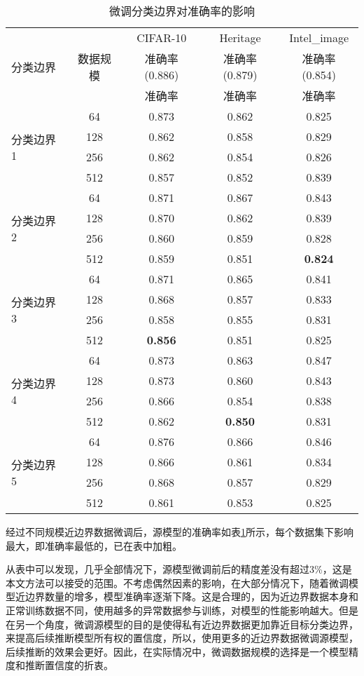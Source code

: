 \begin{table}[h]
	\centering
	\renewcommand\arraystretch{1.2}
	\caption{微调分类边界对准确率的影响}
	\label{table:3}
	\small
	\begin{tabular*}{14cm}{@{\extracolsep{\fill}} l c c c c}
		\toprule[1pt]
		\multirow{3}{5em}{分类边界}&\multirow{3}{5em}{数据规模} & CIFAR-10&Heritage&Intel\_image \\ 
		& & 准确率(0.886)&准确率(0.879)&准确率(0.854) \\
		\cline{3-5}	
		& &准确率&准确率&准确率 \\
		\hline
		\multirow{4}{5em}{分类边界1}&64&0.873&0.862&0.825 \\
		&128&0.862&0.858&0.829 \\
		&256&0.862&0.854&0.826 \\
		&512&0.857&0.852&0.839 \\
		\hline
		\multirow{4}{5em}{分类边界2}&64&0.871&0.867&0.843 \\
		&128&0.870&0.862&0.839 \\
		&256&0.860&0.859&0.828 \\
		&512&0.859&0.851&\textbf{0.824} \\
		\hline
		\multirow{4}{5em}{分类边界3}&64&0.871&0.865&0.841 \\
		&128&0.868&0.857&0.833 \\
		&256&0.858&0.855&0.831 \\
		&512&\textbf{0.856}&0.851&0.825 \\
		\hline
		\multirow{4}{5em}{分类边界4}&64&0.873&0.863&0.847 \\
		&128&0.873&0.860&0.843 \\
		&256&0.866&0.854&0.838 \\
		&512&0.862&\textbf{0.850}&0.831 \\
		\hline
		\multirow{4}{5em}{分类边界5}&64&0.876&0.866&0.846 \\
		&128&0.866&0.861&0.834 \\
		&256&0.868&0.857&0.829 \\
		&512&0.861&0.853&0.825 \\
		\bottomrule[1pt]
\end{tabular*}
\end{table}

	
经过不同规模近边界数据微调后，源模型的准确率如表\ref{table:3}所示，每个数据集下影响最大，即准确率最低的，已在表中加粗。

从表中可以发现，几乎全部情况下，源模型微调前后的精度差没有超过3\%，这是本文方法可以接受的范围。不考虑偶然因素的影响，在大部分情况下，随着微调模型近边界数量的增多，模型准确率逐渐下降。这是合理的，因为近边界数据本身和正常训练数据不同，使用越多的异常数据参与训练，对模型的性能影响越大。但是在另一个角度，微调源模型的目的是使得私有近边界数据更加靠近目标分类边界，来提高后续推断模型所有权的置信度，所以，使用更多的近边界数据微调源模型，后续推断的效果会更好。因此，在实际情况中，微调数据规模的选择是一个模型精度和推断置信度的折衷。

